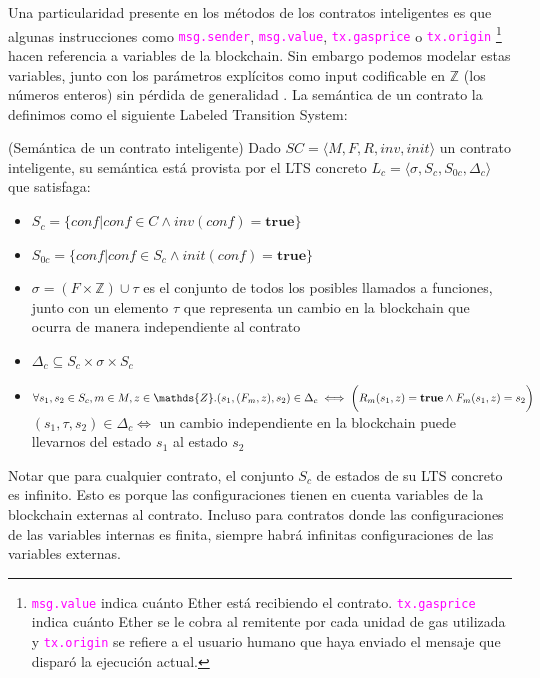 Una particularidad presente en los métodos de los contratos inteligentes es que algunas instrucciones como \textcolor{magenta}{\texttt{msg.sender}}, \textcolor{magenta}{\texttt{msg.value}}, \textcolor{magenta}{\texttt{tx.gasprice}} o \textcolor{magenta}{\texttt{tx.origin}}
\footnote{\textcolor{magenta}{\texttt{msg.value}} indica cuánto Ether está recibiendo el contrato. \textcolor{magenta}{\texttt{tx.gasprice}} indica cuánto Ether se le cobra al remitente por cada unidad de gas utilizada y \textcolor{magenta}{\texttt{tx.origin}} se refiere a el usuario humano que haya enviado el mensaje que disparó la ejecución actual.} hacen referencia a variables de la blockchain.
Sin embargo podemos modelar estas variables, junto con los parámetros explícitos como input codificable en $\mathds{Z}$ (los números enteros) sin pérdida de generalidad \cite{de-caso-epa}.
La semántica de un contrato la definimos como el siguiente Labeled Transition System:

\begin{definition}\label{definicion-lts}(Semántica de un contrato inteligente)
    Dado $SC = \langle M, F, R, inv, init \rangle$ un contrato inteligente, su semántica está provista por el LTS concreto $L_c = \langle \sigma , S_c, S_{0c}, \Delta _c \rangle$ que satisfaga:
    \begin{itemize}
        \item $S_c = \{conf | conf \in C \land inv(conf) = \textbf{true}\}$
        \item $S_{0c} = \{conf | conf \in S_c \land init(conf) = \textbf{true}\}$
        \item $\sigma = (F \times \mathds{Z}) \cup \tau$ es el conjunto de todos los posibles llamados a funciones, junto con un elemento $\tau$ que representa un cambio en la blockchain que ocurra de manera independiente al contrato
        \item $\Delta _c \subseteq S_c \times \sigma \times S_c$
        \item $\forall s_1,s_2 \in S_c, m \in M, z \in \mathds{Z} . \\ (s_1,(F_m,z),s_2) \in \Delta _c \iff \bigg( R_m(s_1,z) = \textbf{true} \land   F_m(s_1,z) = s_2 \bigg)$ \\
              $(s_1,\tau,s_2) \in \Delta _c \iff$ un cambio independiente en la blockchain puede llevarnos del estado $s_1$ al estado $s_2$
    \end{itemize}
\end{definition}
Notar que para cualquier contrato, el conjunto $S_c$ de estados de su LTS concreto es infinito.
Esto es porque las configuraciones tienen en cuenta variables de la blockchain externas al contrato.
Incluso para contratos donde las configuraciones de las variables internas es finita, siempre habrá infinitas configuraciones de las variables externas.
\\

